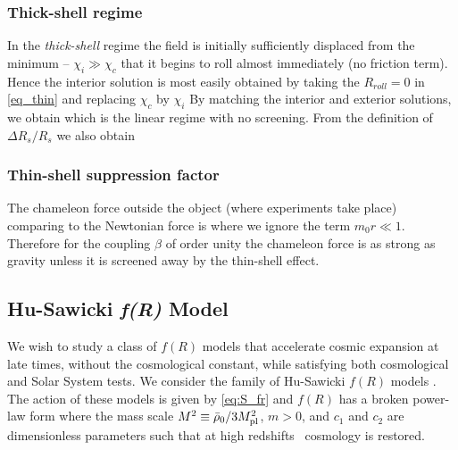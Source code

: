 \subsubsection{Thick-shell regime}
In the \textit{thick-shell} regime the field is initially sufficiently displaced from the minimum -- $\chi_i\gg\chi_c$ that it begins to roll almost immediately (no friction term). Hence the interior solution is most easily obtained by taking the $R_{roll}=0$ in \eqref{eq_thin} and replacing $\chi_c$ by $\chi_i$
By matching the interior and exterior solutions, we obtain
which is the linear regime with no screening. From the definition of $\Delta R_s/R_s$ we also obtain
\subsubsection{Thin-shell suppression factor}
The chameleon force outside the object (where experiments take place) comparing to the Newtonian force is
where we ignore the term $m_0 r\ll1$. Therefore for the coupling $\beta$ of order unity the chameleon force is as strong as gravity unless it is screened away by the thin-shell effect.
\subsection{Hu-Sawicki \texorpdfstring{\textit{\lowercase{f}(R)}}{fR} Model}
We wish to study a class of $f(R)$ models that accelerate cosmic expansion at late times, without the cosmological constant, while satisfying both cosmological and Solar System tests. We consider the family of Hu-Sawicki $f(R)$ models \parencite{Hu-Saw}. The action of these models is given by \eqref{eq:S_fr} and $f(R)$ has a broken power-law form
where the mass scale $M^2\equiv\bar\rho_0/3M_{\text{\scriptsize pl}}^2$, $m>0$, and $c_1$ and $c_2$ are dimensionless parameters such that at high redshifts \LCDM\ cosmology is restored.

